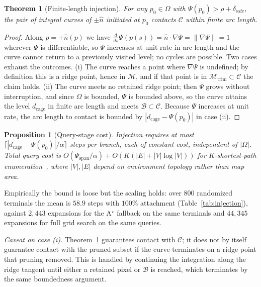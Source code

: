 \documentclass[conference]{IEEEtran}
\newtheorem{theorem}{Theorem}
\newtheorem{proposition}{Proposition}
\begin{document}
\begin{theorem}[Finite-length injection]
\label{thm:injection}
For any $p_0\in\Omega$ with $\Psi(p_0)>\rho+\delta_{\mathrm{safe}}$, the pair of integral curves of $\pm\hat{n}$ initiated at $p_0$ contacts $\mathcal{C}$ within finite arc length.
\end{theorem}
\begin{proof}
Along $\dot{p}=+\hat{n}(p)$ we have $\tfrac{d}{ds}\Psi(p(s))=\hat{n}\cdot\nabla\Psi=\|\nabla\Psi\|=1$ wherever $\Psi$ is differentiable, so $\Psi$ increases at unit rate in arc length and the curve cannot return to a previously visited level; no cycles are possible. Two cases exhaust the outcomes. (i) The curve reaches a point where $\nabla\Psi$ is undefined; by definition this is a ridge point, hence in $\mathcal{M}$, and if that point is in $\mathcal{M}_{\mathrm{trim}}\subset\mathcal{C}$ the claim holds. (ii) The curve meets no retained ridge point; then $\Psi$ grows without interruption, and since $\Omega$ is bounded, $\Psi$ is bounded above, so the curve attains the level $d_{\mathrm{cage}}$ in finite arc length and meets $\mathcal{B}\subset\mathcal{C}$. Because $\Psi$ increases at unit rate, the arc length to contact is bounded by $|d_{\mathrm{cage}}-\Psi(p_0)|$ in case (ii).
\end{proof}

\begin{proposition}[Query-stage cost]
Injection requires at most $\lceil |d_{\mathrm{cage}}-\Psi(p_0)|/\alpha \rceil$ steps per branch, each of constant cost, independent of $|\Omega|$. Total query cost is $O(\Psi_{\text{span}}/\alpha) + O(K(|E|+|V|\log|V|))$ for $K$-shortest-path enumeration~\cite{yen1971}, where $|V|,|E|$ depend on environment topology rather than map area.
\end{proposition}

Empirically the bound is loose but the scaling holds: over $800$ randomized terminals the mean is $58.9$ steps with $100\%$ attachment (Table~\ref{tab:injection}), against $2{,}443$ expansions for the A$^\star$ fallback on the same terminals and $44{,}345$ expansions for full grid search on the same queries.

\emph{Caveat on case (i).} Theorem~\ref{thm:injection} guarantees contact with $\mathcal{C}$; it does not by itself guarantee contact with the pruned subset if the curve terminates on a ridge point that pruning removed. This is handled by continuing the integration along the ridge tangent until either a retained pixel or $\mathcal{B}$ is reached, which terminates by the same boundedness argument.
\end{document}
